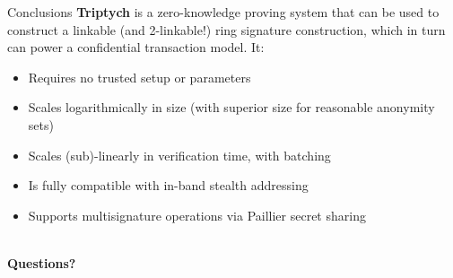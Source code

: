 \documentclass[aspectratio=169]{beamer}
\begin{document}
\begin{frame}{Conclusions}
\textbf{Triptych} is a zero-knowledge proving system that can be used to construct a linkable (and 2-linkable!) ring signature construction, which in turn can power a confidential transaction model. It:
\begin{itemize}
\item Requires no trusted setup or parameters
\item Scales logarithmically in size (with superior size for reasonable anonymity sets)
\item Scales (sub)-linearly in verification time, with batching
\item Is fully compatible with in-band stealth addressing
\item Supports multisignature operations via Paillier secret sharing
\end{itemize}
\begin{center}
~\\
\textbf{\Large Questions?}
\end{center}
\end{frame}
\end{document}
